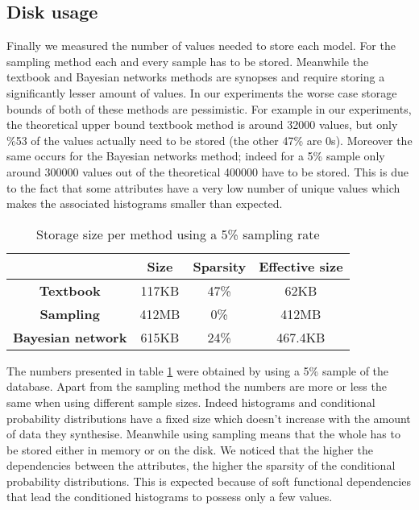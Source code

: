 \documentclass[runningheads]{llncs}
\begin{document}
\subsection{Disk usage}

Finally we measured the number of values needed to store each model. For the sampling method each and every sample has to be stored. Meanwhile the textbook and Bayesian networks methods are synopses and require storing a significantly lesser amount of values. In our experiments the worse case storage bounds of both of these methods are pessimistic. For example in our experiments, the theoretical upper bound textbook method is around 32000 values, but only \%53 of the values actually need to be stored (the other 47\% are 0s). Moreover the same occurs for the Bayesian networks method; indeed for a 5\% sample only around 300000 values out of the theoretical 400000 have to be stored. This is due to the fact that some attributes have a very low number of unique values which makes the associated histograms smaller than expected.

\begin{table}[H]
\centering
\begin{tabular}{@{}c|ccc@{}}
                       & \textbf{Size} & \textbf{Sparsity} & \textbf{Effective size} \\ \hline
\textbf{Textbook}           & 117KB              & 47\%   & 62KB     \\ \hline
\textbf{Sampling}           & 412MB              & 0\%      & 412MB  \\ \hline
\textbf{Bayesian network}           & 615KB      & 24\%         & 467.4KB       \\
        \end{tabular}
        \caption{Storage size per method using a 5\% sampling rate}
        \label{tab:store-size}
\vspace{-4mm}
\end{table}

The numbers presented in table \ref{tab:store-size} were obtained by using a 5\% sample of the database. Apart from the sampling method the numbers are more or less the same when using different sample sizes. Indeed histograms and conditional probability distributions have a fixed size which doesn't increase with the amount of data they synthesise. Meanwhile using sampling means that the whole has to be stored either in memory or on the disk. We noticed that the higher the dependencies between the attributes, the higher the sparsity of the conditional probability distributions. This is expected because of soft functional dependencies that lead the conditioned histograms to possess only a few values. 
\end{document}
